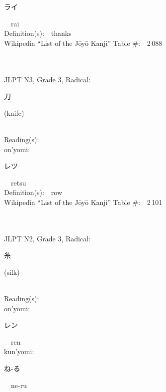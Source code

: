 \begin{multicols}{2}
{\hspace*{2em}}{\begin{CJK}{UTF8}{min} ライ \end{CJK}}\ \ rai\ \ \\
Definition(s):\ \ thanks \\
Wikipedia ``List of the J\=oy\=o Kanji'' Table \#:\ \ 2\,088 \\
\ \ \\
{\fontsize{34pt}{40pt}  }\ \ \\  %
{JLPT N3, Grade 3, Radical:\ \ {\begin{CJK}{UTF8}{min} 刀 \end{CJK}} (knife) } \\
Reading(s):\ \ \\
{\hspace*{1em}}on'yomi:\ \ \\
{\hspace*{2em}}{\begin{CJK}{UTF8}{min} レツ \end{CJK}}\ \ retsu\ \ \\
Definition(s):\ \ row \\
Wikipedia ``List of the J\=oy\=o Kanji'' Table \#:\ \ 2\,101 \\
\ \ \\
{\fontsize{34pt}{40pt}  }\ \ \\  %
{JLPT N2, Grade 3, Radical:\ \ {\begin{CJK}{UTF8}{min} 糸 \end{CJK}} (silk) } \\
Reading(s):\ \ \\
{\hspace*{1em}}on'yomi:\ \ \\
{\hspace*{2em}}{\begin{CJK}{UTF8}{min} レン \end{CJK}}\ \ ren\ \ \\
{\hspace*{1em}}kun'yomi:\ \ \\
{\hspace*{2em}}{\begin{CJK}{UTF8}{min} ね-る \end{CJK}}\ \ ne-ru\ \ \\

\end{multicols}

